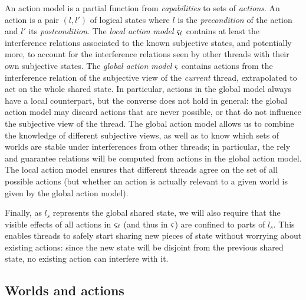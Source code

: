 An action model is a partial function from \emph{capabilities} to sets
of \emph{actions}. An action is a pair $(l,l')$ of logical states
where $l$ is the \emph{precondition} of the action and $l'$ its
\emph{postcondition}.  The \emph{local action model} $\varsigma_{\ell}$
contains at least the interference relations associated to the known
subjective states, and potentially more, to account for the
interference relations seen by other threads with their own subjective
states.  The \emph{global action model} $\varsigma_{}$ contains actions
from the interference relation of the subjective view of the
\emph{current} thread, extrapolated to act on the whole shared
state. In particular, actions in the global model always have a local
counterpart, but the converse does not hold in general: the global
action model may discard actions that are never possible, or that do
not influence the subjective view of the thread. The global action
model allows us to combine the knowledge of different subjective
views, as well as to know which sets of worlds are stable under
interferences from other threads; in particular, the rely and
guarantee relations will be computed from actions in the global action
model. The local action model ensures that different threads agree on
the set of all possible actions (but whether an action is actually
relevant to a given world is given by the global action model).

Finally, as $l_s$ represents the global shared state, we will also
require that the visible effects of all actions in $\varsigma_{\ell}$ (and
thus in $\varsigma_{}$) are confined to parts of $l_s$. This enables
threads to safely start sharing new pieces of state without worrying
about existing actions: since the new state will be disjoint from the
previous shared state, no existing action can interfere with it.




\subsection{Worlds and actions}

